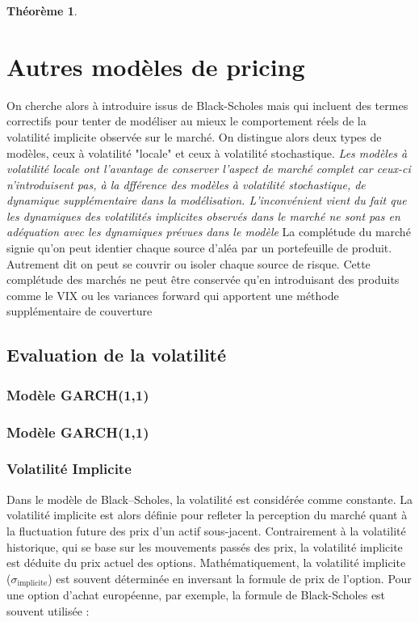\documentclass[a4paper]{article}
\newtheorem{theorem}{Théorème}[section]
\begin{document}
\begin{theorem}
    
\end{theorem}

\section{Autres modèles de pricing}

On cherche alors à introduire issus de Black-Scholes mais qui incluent des termes correctifs pour tenter de modéliser au mieux le comportement réels de la volatilité implicite observée sur le marché. On distingue alors deux types de modèles, ceux à volatilité "locale" et ceux à volatilité stochastique. \textit{Les modèles à volatilité locale ont l'avantage de conserver l'aspect de marché complet car ceux-ci n'introduisent pas, à la dfférence des modèles à volatilité stochastique, de dynamique supplémentaire dans la modélisation. L'inconvénient vient du fait que les dynamiques des volatilités implicites observés dans le marché ne sont pas en adéquation avec les dynamiques prévues dans le modèle} \cite{ENS} La complétude du marché signie qu'on peut identier chaque source d'aléa
par un portefeuille de produit. Autrement dit on peut se couvrir ou isoler
chaque source de risque. Cette complétude des marchés ne peut être conservée qu'en introduisant des produits comme le VIX ou les variances forward qui apportent une méthode supplémentaire de couverture

\subsection{Evaluation de la volatilité}

\subsubsection{Modèle GARCH(1,1)}

\subsubsection{Modèle GARCH(1,1)}

\subsubsection{Volatilité Implicite}

Dans le modèle de Black--Scholes, la volatilité est considérée comme constante. La volatilité implicite est alors définie pour refleter la perception du marché quant à la fluctuation future des prix d'un actif sous-jacent. Contrairement à la volatilité historique, qui se base sur les mouvements passés des prix, la volatilité implicite est déduite du prix actuel des options. Mathématiquement, la volatilité implicite (\(\sigma_{\text{implicite}}\)) est souvent déterminée en inversant la formule de prix de l'option. Pour une option d'achat européenne, par exemple, la formule de Black-Scholes est souvent utilisée :
\end{document}
